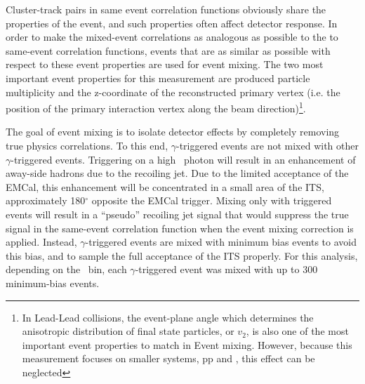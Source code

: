 Cluster-track pairs in same event correlation functions obviously share the properties of the event, and such properties often affect detector response. In order to make the mixed-event correlations as analogous as possible to the to same-event correlation functions, events that are as similar as possible with respect to these event properties are used for event mixing. The two most important event properties for this measurement are produced particle multiplicity and the z-coordinate of the reconstructed primary vertex (i.e. the position of the primary interaction vertex along the beam direction)\footnote{In Lead-Lead collisions, the event-plane angle which determines the anisotropic distribution of final state particles, or $v_{2}$, is also one of the most important event properties to match in Event mixing. However, because this measurement focuses on smaller systems, pp and \pPb, this effect can be neglected}. %




The goal of event mixing is to isolate detector effects by completely removing true physics correlations. To this end, $\gamma$-triggered events are not mixed with other $\gamma$-triggered events. Triggering on a high \pt~photon will result in an enhancement of away-side hadrons due to the recoiling jet. Due to the limited acceptance of the EMCal, this enhancement will be concentrated in a small area of the ITS, approximately 180$^{\circ}$ opposite the EMCal trigger. Mixing only with triggered events will result in a ``pseudo'' recoiling jet signal that would suppress the true signal in the same-event correlation function when the event mixing correction is applied. Instead, $\gamma$-triggered events are mixed with minimum bias events to avoid this bias, and to sample the full acceptance of the ITS properly. For this analysis, depending on the \zt~bin, each \(\gamma\)-triggered event was mixed with up to 300 minimum-bias events.





